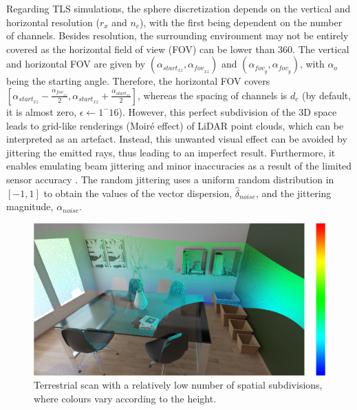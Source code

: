 Regarding TLS simulations, the sphere discretization depends on the vertical and horizontal resolution ($r_x$ and $n_c$), with the first being dependent on the number of channels. Besides resolution, the surrounding environment may not be entirely covered as the horizontal field of view (FOV) can be lower than 360\textdegree. The vertical and horizontal FOV are given by $(\alpha_{\textit{start}_{xz}}, \alpha_{\textit{fov}_{xz}})$ and $(\alpha_{\textit{fov}_{y}}, \alpha_{\textit{fov}_{y}})$, with $\alpha_{o}$ being the starting angle. Therefore, the horizontal FOV covers $[\alpha_{\textit{start}_{xz}} - \frac{\alpha_{\textit{fov}_{xz}}}{2}, \alpha_{\textit{start}_{xz}} + \frac{\alpha_{\textit{start}_{xz}}}{2}]$, whereas the spacing of channels is $d_c$ (by default, it is almost zero, $\epsilon \gets 1^-16$). However, this perfect subdivision of the 3D space leads to grid-like renderings (Moiré effect) of LiDAR point clouds, which can be interpreted as an artefact. Instead, this unwanted visual effect can be avoided by jittering \cite{akenine-moller_real-time_2018} the emitted rays, thus leading to an imperfect result. Furthermore, it enables emulating beam jittering and minor inaccuracies as a result of the limited sensor accuracy \cite{mcmanamon_lidar_2019}. The random jittering uses a uniform random distribution in $[-1, 1]$ to obtain the values of the vector dispersion, $\hat{\delta}_{\textit{noise}}$, and the jittering magnitude, $\alpha_{\textit{noise}}$.

\begin{figure}[ht]
	\centering
	\includegraphics[width=\linewidth]{figs/lidar_simulation/tls_first_approach.png}
	\caption{Terrestrial scan with a relatively low number of spatial subdivisions, where colours vary according to the height.}
	\label{fig:tls_first_approach}
\end{figure}

